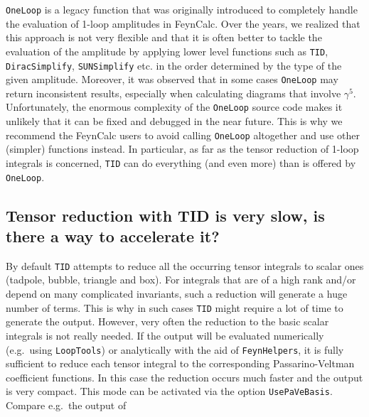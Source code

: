 \documentclass[../FeynCalcManual.tex]{subfiles}
\begin{document}
\texttt{OneLoop} is a legacy function that was originally introduced to
completely handle the evaluation of 1-loop amplitudes in FeynCalc. Over
the years, we realized that this approach is not very flexible and that
it is often better to tackle the evaluation of the amplitude by applying
lower level functions such as \texttt{TID}, \texttt{DiracSimplify},
\texttt{SUNSimplify} etc. in the order determined by the type of the
given amplitude. Moreover, it was observed that in some cases
\texttt{OneLoop} may return inconsistent results, especially when
calculating diagrams that involve \(\gamma^5\). Unfortunately, the
enormous complexity of the \texttt{OneLoop} source code makes it
unlikely that it can be fixed and debugged in the near future. This is
why we recommend the FeynCalc users to avoid calling \texttt{OneLoop}
altogether and use other (simpler) functions instead. In particular, as
far as the tensor reduction of 1-loop integrals is concerned,
\texttt{TID} can do everything (and even more) than is offered by
\texttt{OneLoop}.

\subsection{Tensor reduction with TID is very slow, is there a way to
accelerate
it?}\label{tensor-reduction-with-tid-is-very-slow-is-there-a-way-to-accelerate-it}

By default \texttt{TID} attempts to reduce all the occurring tensor
integrals to scalar ones (tadpole, bubble, triangle and box). For
integrals that are of a high rank and/or depend on many complicated
invariants, such a reduction will generate a huge number of terms. This
is why in such cases \texttt{TID} might require a lot of time to
generate the output. However, very often the reduction to the basic
scalar integrals is not really needed. If the output will be evaluated
numerically (e.g.~using \texttt{LoopTools}) or analytically with the aid
of \texttt{FeynHelpers}, it is fully sufficient to reduce each tensor
integral to the corresponding Passarino-Veltman coefficient functions.
In this case the reduction occurs much faster and the output is very
compact. This mode can be activated via the option
\texttt{UsePaVeBasis}. Compare e.g.~the output of

\begin{Shaded}
\begin{Highlighting}[]
\OperatorTok{[}\OperatorTok{[}\OperatorTok{,}\OperatorTok{]}\OperatorTok{[}\OperatorTok{,}\OperatorTok{]}\OperatorTok{[\{}\OperatorTok{,}\OperatorTok{\},} \OperatorTok{\{} \SpecialCharTok{+}\OperatorTok{,}\OperatorTok{\},} \OperatorTok{\{} \SpecialCharTok{+}\OperatorTok{,}\OperatorTok{\}],} \OperatorTok{]}
\end{Highlighting}
\end{Shaded}
\end{document}
